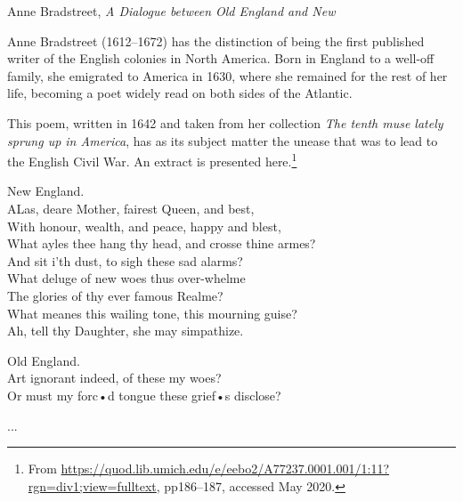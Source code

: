 \begin{texts}{Anne Bradstreet, \emph{A Dialogue between Old England and New}}

Anne Bradstreet (1612--1672) has the distinction of being the first published writer of the English colonies in North America. Born in England to a well-off family, she emigrated to America in 1630, where she remained for the rest of her life, becoming a poet widely read on both sides of the Atlantic.

This poem, written in 1642 and taken from her collection \emph{The tenth muse lately sprung up in America}, has as its subject matter the unease that was to lead to the English Civil War. An extract is presented here.\footnote{From \url{https://quod.lib.umich.edu/e/eebo2/A77237.0001.001/1:11?rgn=div1;view=fulltext}, pp186--187, accessed May 2020.}

\begin{textglossed}
    \internallinenumbers*{}
    New England.\\
    ALas, deare Mother, fairest Queen, and best,\\
    With honour, wealth, and peace, happy and blest,\\
    What ayles thee hang thy head, and crosse thine armes?\\
    And sit i'th dust, to sigh these sad alarms?\\
    What deluge of new woes thus over-whelme\\
    The glories of thy ever famous Realme?\\
    What meanes this wailing tone, this mourning guise?\\
    Ah, tell thy Daughter, she may simpathize.

    Old England.\\
    Art ignorant indeed, of these my woes?\\
    Or must my forc•d tongue these grief•s disclose?
    
    ...
    

\end{textglossed}
\end{texts}
